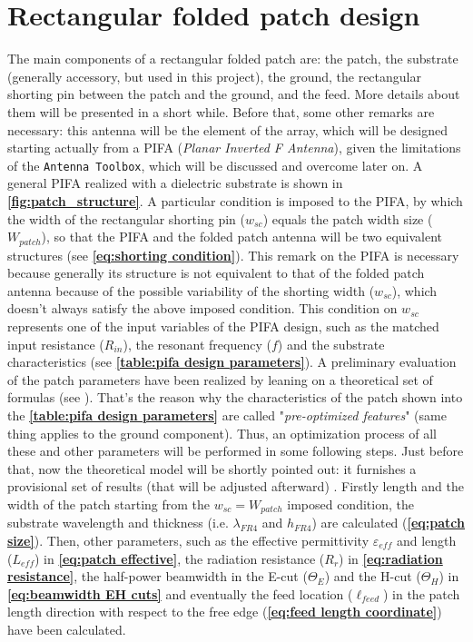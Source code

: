 \documentclass[12pt,a4paper]{article}
\begin{document}
{\newpage
\section*{Rectangular folded patch design}

The main components of a rectangular folded patch are: the patch, the substrate (generally accessory, but used in this project), the ground, the rectangular shorting pin between the patch and the ground, and the feed. More details about them will be presented in a short while. Before that, some other remarks are necessary: this antenna will be the element of the array, which will be designed starting actually from a PIFA (\emph{Planar Inverted F Antenna}), given the limitations of the \texttt{\color{Mahogany}Antenna Toolbox}, which will be discussed and overcome later on. A general PIFA realized with a dielectric substrate is shown in \textbf{\cref{fig:patch_structure}}. A particular condition is imposed to the PIFA, by which the width of the rectangular shorting pin ($w_{sc}$) equals the patch width size ($W_{patch}$), so that the PIFA and the folded patch antenna will be two equivalent structures (see \textbf{\cref{eq:shorting condition}}). This remark on the PIFA is necessary because generally its structure is not equivalent to that of the folded patch antenna because of the possible variability of the shorting width ($w_{sc}$), which doesn't always satisfy the above imposed condition. This condition on $w_{sc}$ represents one of the input variables of the PIFA design, such as the matched input resistance ($R_{in}$), the resonant frequency ($f$) and the substrate characteristics (see \textbf{\cref{table:pifa design parameters}}). A preliminary evaluation of the patch parameters have been realized by leaning on a theoretical set of formulas (see \textbf{\cite{Balanis1}}). That's the reason why the characteristics of the patch shown into the \textbf{\cref{table:pifa design parameters}} are called "\emph{pre-optimized features}" (same thing applies to the ground component). Thus, an optimization process of all these and other parameters will be performed in some following steps. Just before that, now the theoretical model will be shortly pointed out: it furnishes a provisional set of results (that will be adjusted afterward) . Firstly length and the width of the patch starting from the $w_{sc}=W_{patch}$ imposed condition, the substrate wavelength and thickness (i.e. $\lambda_{FR4}$ and $h_{FR4}$) are calculated (\textbf{\cref{eq:patch size}}). Then, other parameters, such as the effective permittivity $\varepsilon_{eff}$  and length ($L_{eff}$) in \textbf{\cref{eq:patch effective}}, the radiation resistance ($R_r$) in \textbf{\cref{eq:radiation resistance}}, the half-power beamwidth in the E-cut ($\Theta_E$) and the H-cut ($\Theta_H$) in \textbf{\cref{eq:beamwidth EH cuts}} and eventually the feed location ($\ell_{feed}$) in the patch length direction with respect to the free edge (\textbf{\cref{eq:feed length coordinate}}) have been calculated. 

}
\end{document}
